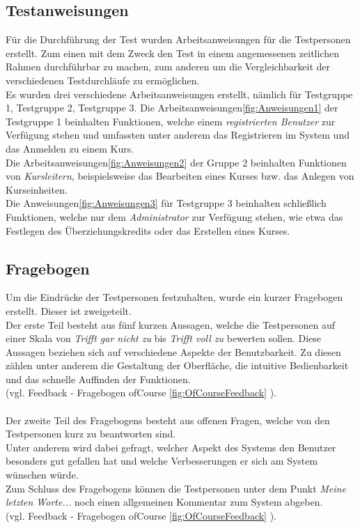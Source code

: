 \subsection{Testanweisungen}
Für die Durchführung der Test wurden Arbeitsanweisungen für die Testpersonen erstellt. Zum einen mit dem Zweck den Test in einem angemessenen zeitlichen Rahmen durchführbar zu machen, zum anderen um die Vergleichbarkeit der verschiedenen Testdurchläufe zu ermöglichen.\ \\
Es wurden drei verschiedene Arbeitsanweisungen erstellt, nämlich für Testgruppe 1, Testgruppe 2, Testgruppe 3. Die Arbeitsanweisungen\ref{fig:Anweisungen1} der Testgruppe 1 beinhalten Funktionen, welche einem {\it registrierten Benutzer} zur Verfügung stehen und umfassten unter anderem das Registrieren im System und das Anmelden zu einem Kurs.\\
Die Arbeitsanweisungen\ref{fig:Anweisungen2} der Gruppe 2  beinhalten Funktionen von {\it Kursleitern}, beispielsweise das Bearbeiten eines Kurses bzw. das Anlegen von Kurseinheiten.\\
Die Anweisungen\ref{fig:Anweisungen3} für Testgruppe 3 beinhalten schließlich Funktionen, welche nur dem {\it Administrator} zur Verfügung stehen, wie etwa das Festlegen des Überziehungskredits oder das Erstellen eines Kurses.
\subsection{Fragebogen}
Um die Eindrücke der Testpersonen festzuhalten, wurde ein kurzer Fragebogen erstellt. Dieser ist zweigeteilt. \\
Der erste Teil besteht aus fünf kurzen Aussagen, welche die Testpersonen auf einer Skala von {\it Trifft gar nicht zu} bis 
{\it Trifft voll zu} bewerten sollen. Diese Aussagen beziehen sich auf verschiedene Aspekte der Benutzbarkeit.
Zu diesen zählen unter anderem die Gestaltung der Oberfläche, die intuitive Bedienbarkeit und das schnelle Auffinden der Funktionen.\\
(vgl. Feedback - Fragebogen ofCourse \ref{fig:OfCourseFeedback} ).\ \\
\ \\
Der zweite Teil des Fragebogens besteht aus offenen Fragen, welche von den Testpersonen kurz zu beantworten sind.\\
Unter anderem wird dabei gefragt, welcher Aspekt des Systems den Benutzer besonders gut gefallen hat und welche Verbesserungen er sich am System wünschen würde.\\
Zum Schluss des Fragebogens können die Testpersonen unter dem Punkt {\it Meine letzten Worte...} noch einen allgemeinen Kommentar zum System abgeben. \\
(vgl. Feedback - Fragebogen ofCourse \ref{fig:OfCourseFeedback} ).\ \\


